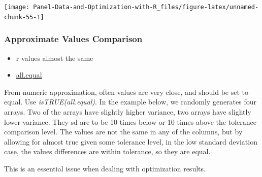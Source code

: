 \documentclass[
]{book}
\providecommand{\tightlist}{%
  \setlength{\itemsep}{0pt}\setlength{\parskip}{0pt}}
\begin{document}
\begin{center}\texttt{[image: Panel-Data-and-Optimization-with-R\_files/figure-latex/unnamed-chunk-55-1]} \end{center}

\hypertarget{approximate-values-comparison}{%
\subsubsection{Approximate Values Comparison}\label{approximate-values-comparison}}

\begin{itemize}
\tightlist
\item
  r values almost the same
\item
  \href{https://stat.ethz.ch/R-manual/R-patched/library/base/html/all.equal.html}{all.equal}
\end{itemize}

From numeric approximation, often values are very close, and should be set to equal. Use \emph{isTRUE(all.equal)}. In the example below, we randomly generates four arrays. Two of the arrays have slightly higher variance, two arrays have slightly lower variance. They sd are to be 10 times below or 10 times above the tolerance comparison level. The values are not the same in any of the columns, but by allowing for almost true given some tolerance level, in the low standard deviation case, the values differences are within tolerance, so they are equal.

This is an essential issue when dealing with optimization results.
\end{document}
